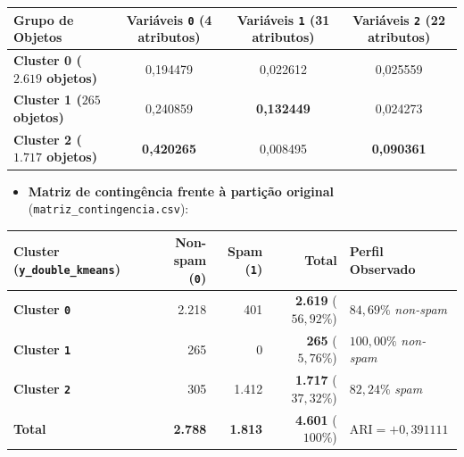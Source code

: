 \documentclass[a4paper,11pt]{article}
\begin{document}
\begin{center}
\begin{minipage}{\linewidth}
\centering
{}
\small
\setlength{\tabcolsep}{5pt}
\renewcommand{\arraystretch}{1.18}
\begin{tabular}{l c c c}
\toprule
\textbf{Grupo de Objetos} & \textbf{Variáveis \texttt{0} (4 atributos)} & \textbf{Variáveis \texttt{1} (31 atributos)} & \textbf{Variáveis \texttt{2} (22 atributos)} \\
\midrule
\textbf{Cluster 0 ($2.619$ objetos)} & 0,194479 & 0,022612 & 0,025559 \\
\textbf{Cluster 1 ($265$ objetos)} & 0,240859 & \textbf{0,132449} & 0,024273 \\
\textbf{Cluster 2 ($1.717$ objetos)} & \textbf{0,420265} & 0,008495 & \textbf{0,090361} \\
\bottomrule
\end{tabular}
\end{minipage}
\end{center}


\begin{itemize}[leftmargin=1.5em, itemsep=0.25em, topsep=0.25em]
  \item \textbf{Matriz de contingência frente à partição original} (\texttt{matriz\_\allowbreak contingencia.csv}):
\end{itemize}
\begin{center}
\begin{minipage}{\linewidth}
\centering
{}
\small
\sloppy
\setlength{\tabcolsep}{5pt}
\renewcommand{\arraystretch}{1.18}
\begin{tabularx}{\linewidth}{l r r r L}
\toprule
\textbf{Cluster (\texttt{y\_\allowbreak double\_\allowbreak kmeans})} & \textbf{Non-spam (\texttt{0})} & \textbf{Spam (\texttt{1})} & \textbf{Total} & \textbf{Perfil Observado} \\
\midrule
\textbf{Cluster \texttt{0}} & 2.218 & 401 & \textbf{2.619} ($56,92\%$) & $84,69\%$ \textit{non-spam} \\
\textbf{Cluster \texttt{1}} & 265 & 0 & \textbf{265} ($5,76\%$) & $100,00\%$ \textit{non-spam} \\
\textbf{Cluster \texttt{2}} & 305 & 1.412 & \textbf{1.717} ($37,32\%$) & $82,24\%$ \textit{spam} \\
\textbf{Total} & \textbf{2.788} & \textbf{1.813} & \textbf{4.601} ($100\%$) & $\text{ARI} = +0,391111$ \\
\bottomrule
\end{tabularx}
\end{minipage}
\end{center}
\end{document}
